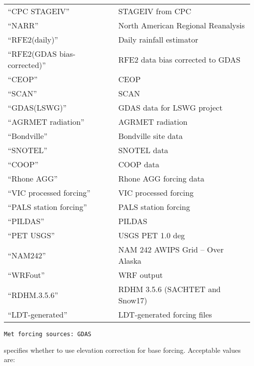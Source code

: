 \begin{tabular}{ll}
 ``CPC STAGEIV''               & STAGEIV from CPC                   \\
 ``NARR''                      & North American Regional Reanalysis \\
 ``RFE2(daily)''               & Daily rainfall estimator           \\
 ``RFE2(GDAS bias-corrected)'' & RFE2 data bias corrected to GDAS   \\
 ``CEOP''                      & CEOP                               \\
 ``SCAN''                      & SCAN                               \\
 ``GDAS(LSWG)''                & GDAS data for LSWG project         \\
 ``AGRMET radiation''          & AGRMET radiation                   \\
 ``Bondville''                 & Bondville site data                \\
 ``SNOTEL''                    & SNOTEL data                        \\
 ``COOP''                      & COOP data                          \\
 ``Rhone AGG''                 & Rhone AGG forcing data             \\
 ``VIC processed forcing''     & VIC processed forcing              \\
 ``PALS station forcing''      & PALS station forcing               \\
 ``PILDAS''                    & PILDAS                             \\
 ``PET USGS''                  & USGS PET 1.0 deg                   \\
 ``NAM242''                    & NAM 242 AWIPS Grid -- Over Alaska  \\
 ``WRFout''                    & WRF output                         \\
 ``RDHM.3.5.6''                & RDHM 3.5.6 (SACHTET and Snow17)    \\
 ``LDT-generated''             & LDT-generated forcing files        \\
 \end{tabular}
 

 \begin{Verbatim}[frame=single]
Met forcing sources: GDAS
 \end{Verbatim}

 
  specifies whether 
 to use elevation correction for base forcing.
 Acceptable values are:

